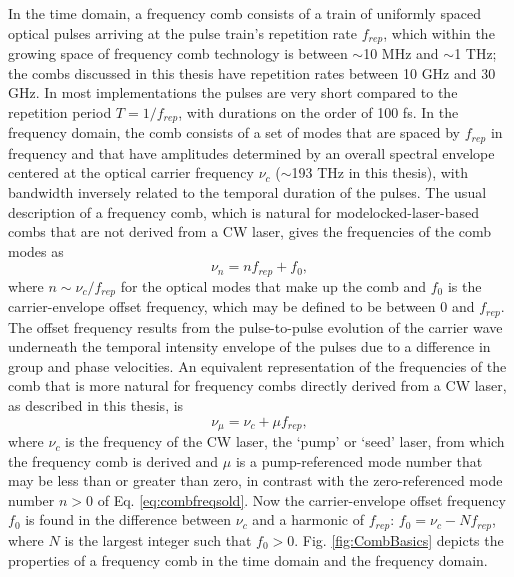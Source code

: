 In the time domain, a frequency comb consists of a train of uniformly spaced optical pulses arriving at the pulse train's repetition rate $f_{rep}$, which within the growing space of frequency comb technology is between $\sim$10 MHz and $\sim$1 THz; the combs discussed in this thesis have repetition rates between 10 GHz and 30 GHz. In most implementations the pulses are very short compared to the repetition period $T=1/f_{rep}$, with durations on the order of 100 fs. In the frequency domain, the comb consists of a set of modes that are spaced by $f_{rep}$ in frequency and that have amplitudes determined by an overall spectral envelope centered at the optical carrier frequency $\nu_c$ ($\sim$193 THz in this thesis), with bandwidth inversely related to the temporal duration of the pulses. The usual description of a frequency comb, which is natural for modelocked-laser-based combs that are not derived from a CW laser, gives the frequencies of the comb modes as 
\begin{equation}
\nu_n=nf_{rep}+f_0, \label{eq:combfreqsold}
\end{equation} 
where $n\sim \nu_c/f_{rep}$ for the optical modes that make up the comb and $f_0$ is the carrier-envelope offset frequency, which may be defined to be between $0$ and $f_{rep}$. The offset frequency results from the pulse-to-pulse evolution of the carrier wave underneath the temporal intensity envelope of the pulses due to a difference in group and phase velocities. An equivalent representation of the frequencies of the comb that is more natural for frequency combs directly derived from a CW laser, as described in this thesis, is
\begin{equation}
\nu_\mu=\nu_c+\mu f_{rep}, \label{eq:combfreqsnew}
\end{equation} 
where $\nu_c$ is the frequency of the CW laser, the `pump' or `seed' laser, from which the frequency comb is derived and $\mu$ is a pump-referenced mode number that may be less than or greater than zero, in contrast with the zero-referenced mode number $n>0$ of Eq. \ref{eq:combfreqsold}. Now the carrier-envelope offset frequency $f_0$ is found in the difference between $\nu_c$ and a harmonic of $f_{rep}$: $f_0=\nu_c-N f_{rep}$, where $N$ is the largest integer such that $f_0>0$. Fig. \ref{fig:CombBasics} depicts the properties of a frequency comb in the time domain and the frequency domain.

